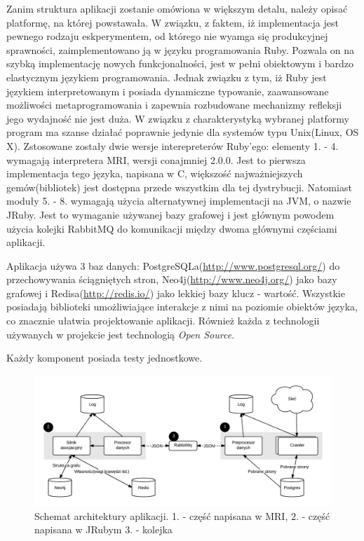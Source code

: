 Zanim struktura aplikacji zostanie omówiona w większym detalu, należy opisać platformę, na której powstawała. W związku, z faktem, iż implementacja jest pewnego rodzaju eskperymentem, 
od którego nie wyamga się produkcyjnej sprawności, zaimplementowano ją w języku programowania Ruby. Pozwala on na szybką implementację nowych funkcjonalności, jest w pełni obiektowym i
bardzo elastycznym językiem programowania. Jednak związku z tym, iż Ruby jest językiem interpretowanym i posiada dynamiczne typowanie, zaawansowane możliwości metaprogramowania i 
zapewnia rozbudowane mechanizmy refleksji jego wydajność nie jest duża.
W związku z charakterystyką wybranej platformy program ma szanse działać poprawnie jedynie dla systemów typu Unix(Linux, OS X). Zstosowane zostały dwie wersje interepreterów Ruby'ego:
elementy 1. - 4. wymagają interpretera MRI, wersji conajmniej 2.0.0. Jest to pierwsza implementacja tego języka, napisana w C, większość najważniejszych gemów(bibliotek) jest dostępna 
przede wszystkim dla tej dystrybucji. Natomiast moduły 5. - 8. wymagają użycia alternatywnej implementacji na JVM, o nazwie JRuby. Jest to wymaganie używanej bazy grafowej i jest głównym 
powodem użycia kolejki RabbitMQ do komunikacji między dwoma głównymi częściami aplikacji.

Aplikacja używa 3 baz danych: PostgreSQLa(\url{http://www.postgresql.org/}) do przechowywania ściągniętych stron, Neo4j(\url{http://www.neo4j.org/}) jako bazy grafowej i Redisa(\url{http://redis.io/})
 jako lekkiej bazy klucz - wartość. Wszystkie posiadają biblioteki umożliwiające interakcje z nimi na poziomie obiektów języka, co znacznie ułatwia projektowanie aplikacji. Również każda
 z technologii używanych w projekcie jest technologią \emph{Open Source}.
 
 Każdy komponent posiada testy jednostkowe.

\begin{figure}[!h]
    \centering
    \label{graph:aplikacja}
    \includegraphics[scale=0.2]{aplikacja}
    \caption{Schemat architektury aplikacji. 1. - część napisana w MRI, 2. - część napisana w JRubym 3. - kolejka}
\end{figure}

